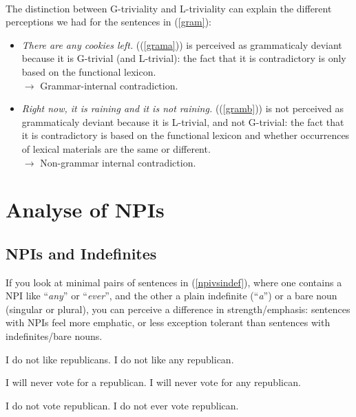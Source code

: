 \documentclass[a4paper,11pt]{article}
\newcommand{\reff}[1]{(\ref{#1})}
\newcommand{\exs}[2][]{\begin{exe}\ex #1 \begin{xlist}#2\end{xlist}\end{exe}}
\begin{document}
 \paragraph{}
 The distinction between G-triviality and L-triviality can explain the different perceptions we had for the sentences in \reff{gram}:
 \begin{itemize}
 \item \textit{There are any cookies left.} (\reff{grama}) is perceived as grammaticaly deviant because it is G-trivial (and L-trivial): the fact that it is contradictory is only based on the functional lexicon. 
 \\$\rightarrow$ Grammar-internal contradiction. 
 \item \textit{Right now, it is raining and it is not raining.} (\reff{gramb}) is not perceived as grammaticaly deviant because it is L-trivial, and not G-trivial: the fact that it is contradictory is based on the functional lexicon and whether occurrences of lexical materials are the same or different.  
 \\$\rightarrow$ Non-grammar internal contradiction. 
 \end{itemize}

\section{Analyse of NPIs}

\subsection{NPIs and Indefinites}
If you look at minimal pairs of sentences in \reff{npivsindef}, where one contains a NPI like \enquote{\emph{any}} or \enquote{\emph{ever}}, and the other a plain indefinite (\enquote{\emph{a}}) or a bare noun (singular or plural), you can perceive a difference in strength/emphasis: sentences with NPIs feel more emphatic, or less exception tolerant than sentences with indefinites/bare nouns.

\exs[\label{npivsindef}]{
  \ex\label{npivsindefa}
    \begin{xlist}
      \ex I do not like republicans.
      \ex I do not like any republican.
    \end{xlist}
  \ex
    \begin{xlist}
      \ex I will never vote for a republican.
      \ex I will never vote for any republican.
    \end{xlist}
  \ex
    \begin{xlist}
      \ex I do not vote republican.
      \ex I do not ever vote republican.
    \end{xlist}
}
\end{document}
